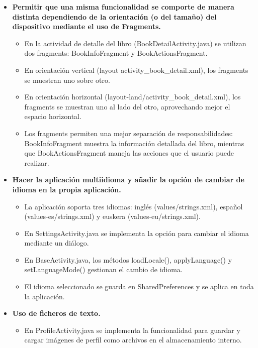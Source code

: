 \documentclass[a4paper,10pt]{report}
\begin{document}
      \begin{itemize}
        \item \textbf{Permitir que una misma funcionalidad se comporte de manera distinta dependiendo de la orientación (o del tamaño) del dispositivo mediante el uso de Fragments.}
        \begin{itemize}
          \item En la actividad de detalle del libro (BookDetailActivity.java) se utilizan dos fragments: BookInfoFragment y BookActionsFragment\cite{android_fragments}.
          \item En orientación vertical (layout activity\_book\_detail.xml), los fragments se muestran uno sobre otro.
          \item En orientación horizontal (layout-land/activity\_book\_detail.xml), los fragments se muestran uno al lado del otro, aprovechando mejor el espacio horizontal.
          \item Los fragments permiten una mejor separación de responsabilidades: BookInfoFragment muestra la información detallada del libro, mientras que BookActionsFragment maneja las acciones que el usuario puede realizar.
        \end{itemize}
        \item \textbf{Hacer la aplicación multiidioma y añadir la opción de cambiar de idioma en la propia aplicación.}
        \begin{itemize}
          \item La aplicación soporta tres idiomas: inglés (values/strings.xml), español (values-es/strings.xml) y euskera (values-eu/strings.xml)\cite{android_localization}.
          \item En SettingsActivity.java se implementa la opción para cambiar el idioma mediante un diálogo.
          \item En BaseActivity.java, los métodos loadLocale(), applyLanguage() y setLanguageMode() gestionan el cambio de idioma.
          \item El idioma seleccionado se guarda en SharedPreferences y se aplica en toda la aplicación.
        \end{itemize}
        \item \textbf{Uso de ficheros de texto.}
        \begin{itemize}
          \item En ProfileActivity.java se implementa la funcionalidad para guardar y cargar imágenes de perfil como archivos en el almacenamiento interno.

\end{itemize}
\end{itemize}
\end{document}
